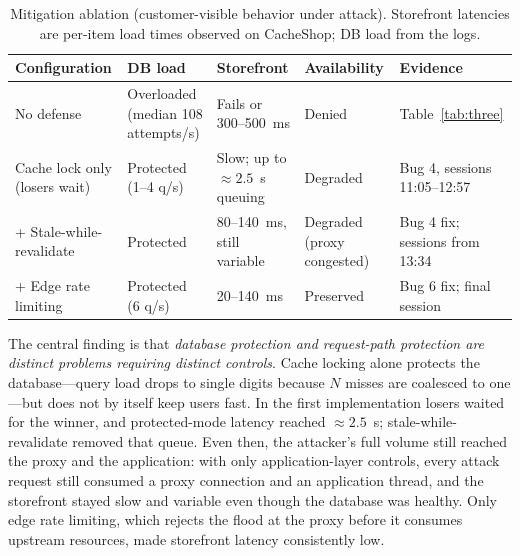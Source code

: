 \begin{table}[t]
\centering
\caption{Mitigation ablation (customer-visible behavior under attack). Storefront
latencies are per-item load times observed on CacheShop; DB load from the logs.}
\label{tab:ablation}
\small
\begin{tabularx}{\linewidth}{@{}L{3.4cm}L{2.5cm}L{3.1cm}L{1.8cm}Y@{}}
\toprule
Configuration & DB load & Storefront & Availability & Evidence \\
\midrule
No defense & Overloaded (median 108 attempts/s) & Fails or 300--500~ms & Denied & Table~\ref{tab:three} \\
Cache lock only (losers wait) & Protected (1--4 q/s) & Slow; up to ${\approx}2.5$~s queuing & Degraded & Bug 4, sessions 11:05--12:57 \\
+ Stale-while-revalidate & Protected & 80--140~ms, still variable & Degraded (proxy congested) & Bug 4 fix; sessions from 13:34 \\
+ Edge rate limiting & Protected (6 q/s) & 20--140~ms & Preserved & Bug 6 fix; final session \\
\bottomrule
\end{tabularx}
\end{table}

The central finding is that \emph{database protection and request-path protection are
distinct problems requiring distinct controls}. Cache locking alone protects the
database---query load drops to single digits because $N$ misses are coalesced to
one---but does not by itself keep users fast. In the first implementation losers
waited for the winner, and protected-mode latency reached ${\approx}2.5$~s;
stale-while-revalidate removed that queue. Even then, the attacker's full volume still
reached the proxy and the application: with only application-layer controls, every
attack request still consumed a proxy connection and an application thread, and the
storefront stayed slow and variable even though the database was healthy. Only edge
rate limiting, which rejects the flood at the proxy before it consumes upstream
resources, made storefront latency consistently low.

